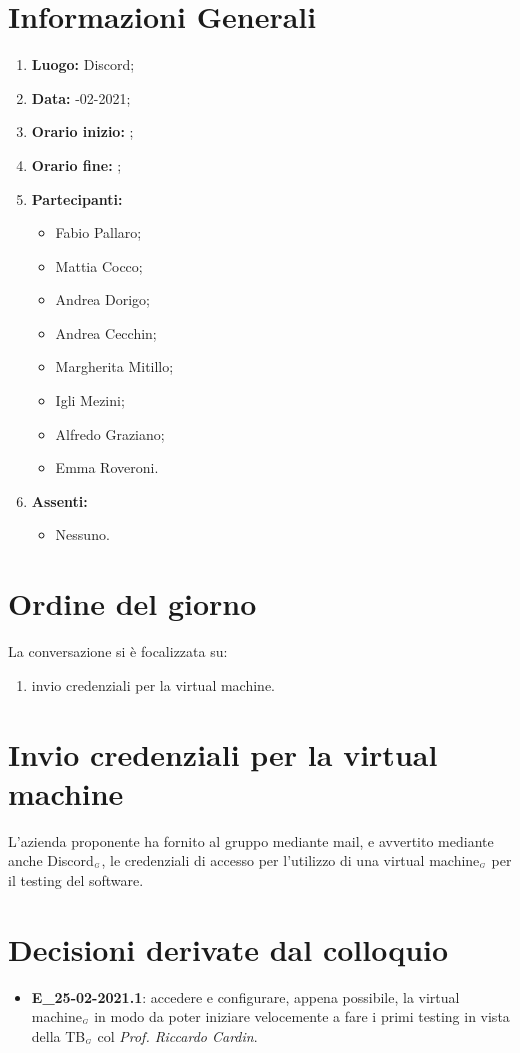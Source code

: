\newpage
\section{Informazioni Generali}
\begin{enumerate}
	\item \textbf{Luogo:} \normalfont Discord;
	\item \textbf{Data:} -02-2021;
	\item \textbf{Orario inizio:} ;
	\item \textbf{Orario fine:} ;
	\item \textbf{Partecipanti:}
	\begin{itemize}
		\item Fabio Pallaro;
		\item Mattia Cocco;
		\item Andrea Dorigo;
		\item Andrea Cecchin;
		\item Margherita Mitillo;
		\item Igli Mezini;
		\item Alfredo Graziano;
		\item Emma Roveroni.
	\end{itemize}
	\item \textbf{Assenti:}
	\begin{itemize}
		\item Nessuno.
	\end{itemize}
\end{enumerate}
\section{Ordine del giorno}
La conversazione si è focalizzata su:
\begin{enumerate}
	\item invio credenziali per la virtual machine.
\end{enumerate}

\section{Invio credenziali per la virtual machine}
L'azienda proponente ha fornito al gruppo mediante mail, e avvertito mediante anche Discord$_{\scaleto{G}{3pt}}$, le credenziali di accesso per l'utilizzo di una virtual machine$_{\scaleto{G}{3pt}}$ per il testing del software.

\section{Decisioni derivate dal colloquio}
\begin{itemize}
	\item \textbf{E\_25-02-2021.1}: accedere e configurare, appena possibile, la virtual machine$_{\scaleto{G}{3pt}}$ in modo da poter iniziare velocemente a fare i primi testing in vista della TB$_{\scaleto{G}{3pt}}$ col \textit{Prof. Riccardo Cardin}.
\end{itemize}
